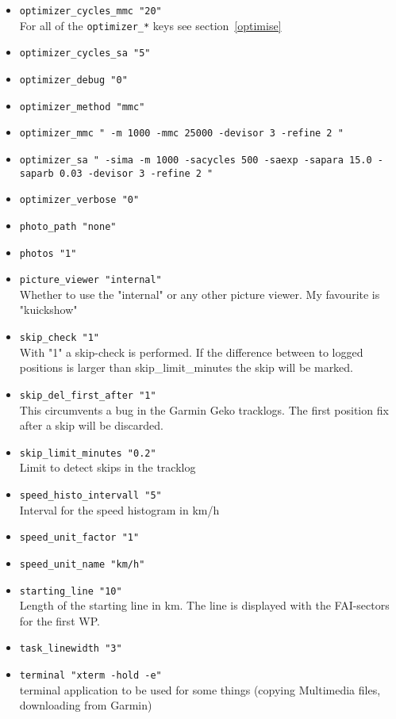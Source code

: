 \begin{itemize}
\item \texttt{optimizer\_cycles\_mmc    "20"} \\
	For all of the \texttt{optimizer\_*} keys see section~\ref{optimise}
\item \texttt{optimizer\_cycles\_sa    "5"}
\item \texttt{optimizer\_debug    "0"}
\item \texttt{optimizer\_method    "mmc"}
\item \texttt{optimizer\_mmc    " -m 1000 -mmc 25000 -devisor 3 -refine 2 "}
\item \texttt{optimizer\_sa    " -sima -m 1000 -sacycles 500 -saexp -sapara 15.0 -saparb 0.03 -devisor 3 -refine 2 "}
\item \texttt{optimizer\_verbose    "0"}


\item \texttt{photo\_path    "none"}
\item \texttt{photos    "1"}
\item \texttt{picture\_viewer    "internal"}\\
    Whether to use the "internal" or any other picture viewer. My favourite is "kuickshow"
\item \texttt{skip\_check    "1"}\\
    With "1" a skip-check is performed. If the difference between to logged positions is larger than
    skip\_limit\_minutes the skip will be marked.
\item \texttt{skip\_del\_first\_after    "1"} \\
	This circumvents a bug in the Garmin Geko tracklogs. The first position fix after a skip will be discarded.
\item \texttt{skip\_limit\_minutes    "0.2"}\\
    Limit to detect skips in the tracklog
\item \texttt{speed\_histo\_intervall    "5"}\\
    Interval for the speed histogram in km/h
\item \texttt{speed\_unit\_factor    "1"}
\item \texttt{speed\_unit\_name    "km/h"}

\item \texttt{starting\_line    "10"}\\
  Length of the starting line in km. The line is displayed with the FAI-sectors for the first WP.


\item \texttt{task\_linewidth    "3"}
\item \texttt{terminal    "xterm -hold -e"} \\
	terminal application to be used for some things (copying Multimedia files, downloading from Garmin)


\end{itemize}
